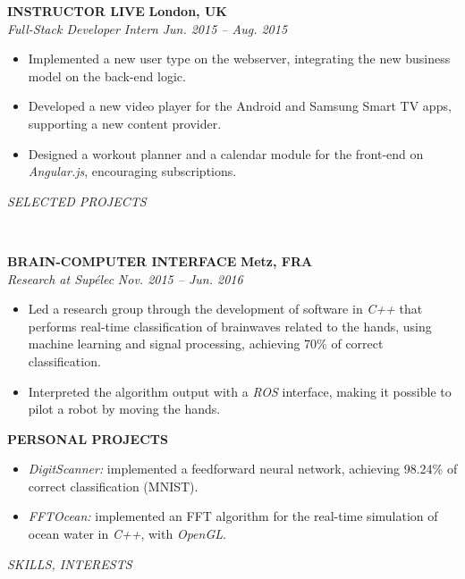 \documentclass[a4paper, 12pt]{article}
\newcommand{\marginline}{-0.3cm}
\newcommand{\margincontent}{-0.6cm}
\newcommand{\marginbeforesection}{0.3cm}
\newcommand{\marginbeforemisc}{-0.75cm}
\newcommand{\linewidthperso}{0.02cm}
\newcommand{\stylesection}[1]{
  \vspace{\marginbeforesection}
  \begin{normalsize}\textit{#1}\end{normalsize}
  \vspace{\marginline}\\
  \noindent\makebox[\linewidth]{\rule{\textwidth}{\linewidthperso}}

}
\newcommand{\styletitle}[1]{\textbf{#1}}
\newcommand{\styledesc}[1]{\textit{#1}}
\newcommand{\styleloc}[1]{\textbf{#1}}
\newcommand{\styledates}[1]{\textit{#1}}
\begin{document}
\begin{footnotesize}
\styletitle{INSTRUCTOR LIVE} \hfill \styleloc{London, UK}\\
\styledesc{Full-Stack Developer Intern} \hfill \styledates{Jun. 2015 -- Aug. 2015}\\
\vspace{\margincontent}
\begin{itemize}
  \item Implemented a new user type on the webserver, integrating the new business model on the back-end logic.
  \item Developed a new video player for the Android and Samsung Smart TV apps, supporting a new content provider.
  \item Designed a workout planner and a calendar module for the front-end on \textit{Angular.js}, encouraging subscriptions.
\end{itemize}

\stylesection{SELECTED PROJECTS}
   
\styletitle{BRAIN-COMPUTER INTERFACE} \hfill \styleloc{Metz, FRA}\\
\styledesc{Research at Sup\'elec} \hfill \styledates{Nov. 2015 -- Jun. 2016}\\
\vspace{\margincontent}
\begin{itemize}
  \item Led a research group through the development of software in \textit{C++} that performs real-time classification of brainwaves related to the hands, using machine learning and signal processing, achieving 70\% of correct classification.
  \item Interpreted the algorithm output with a \textit{ROS} interface, making it possible to pilot a robot by moving the hands.
\end{itemize}

\styletitle{PERSONAL PROJECTS}\\
\vspace{\margincontent}
\begin{itemize}
  \item \textit{DigitScanner:} implemented a feedforward neural network, achieving 98.24\% of correct classification (MNIST).
  \item \textit{FFTOcean:} implemented an FFT algorithm for the real-time simulation of ocean water in \textit{C++}, with \textit{OpenGL}.
\end{itemize}

\stylesection{SKILLS, INTERESTS}
~\\
\vspace{\marginbeforemisc}


\end{footnotesize}
\end{document}
